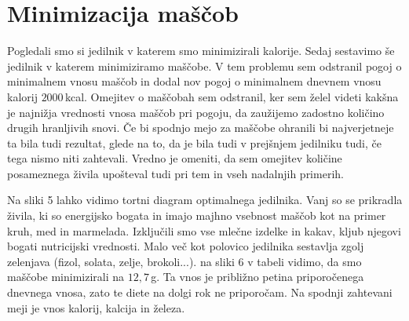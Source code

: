 \documentclass[slovene,11pt,a4paper]{article}
\begin{document}
\section{Minimizacija maščob}

Pogledali smo si jedilnik v katerem smo minimizirali kalorije. Sedaj sestavimo še jedilnik v katerem minimiziramo maščobe. V tem problemu sem odstranil pogoj o minimalnem vnosu maščob in dodal nov pogoj o minimalnem dnevnem vnosu kalorij $2000\,$kcal. Omejitev o maščobah sem odstranil, ker sem želel videti kakšna je najnižja vrednosti vnosa maščob pri pogoju, da zaužijemo zadostno količino drugih hranljivih snovi. Če bi spodnjo mejo za maščobe ohranili bi najverjetneje ta bila tudi rezultat, glede na to, da je bila tudi v prejšnjem jedilniku tudi, če tega nismo niti zahtevali. Vredno je omeniti, da sem omejitev količine posameznega živila upošteval tudi pri tem in vseh nadalnjih primerih.

Na sliki 5 lahko vidimo tortni diagram optimalnega jedilnika. Vanj so se prikradla živila, ki so energijsko bogata in imajo majhno vsebnost maščob kot na primer kruh, med in marmelada. Izključili smo vse mlečne izdelke in kakav, kljub njegovi bogati nutricijski vrednosti. Malo več kot polovico jedilnika sestavlja zgolj zelenjava (fizol, solata, zelje, brokoli...). na sliki 6 v tabeli vidimo, da smo maščobe minimizirali na $12,7\,$g. Ta vnos je približno petina priporočenega dnevnega vnosa, zato te diete na dolgi rok ne priporočam. Na spodnji zahtevani meji je vnos kalorij, kalcija in železa.

\newpage
\end{document}
